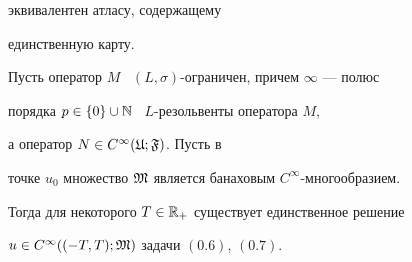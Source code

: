 эквивалентен атласу, содержащему


единственную карту.








\begin{thms}


Пусть оператор $M$ \ $(L,\sigma)$-ограничен, причем $\infty$ --- полюс 


порядка $p \in \{0\}\cup \Bbb{N}$ \ $L$-резольвенты оператора $M$, 


а оператор $N \in C^{\infty}(\frak{U};\frak{F})$. Пусть в


точке $u_0$ множество $\frak{M}$ является банаховым $C^{\infty}$-многообразием. 


Тогда для некоторого $T\in \Bbb{R}_+$ существует единственное решение


$u \in C^{\infty}((-T,T);\frak{M})$ задачи $(0.6)$, $(0.7)$.


\end{thms}








